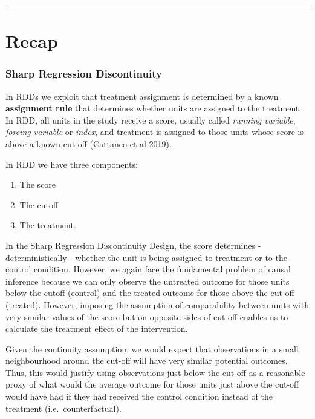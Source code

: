 \documentclass[
  letterpaper,
  DIV=11,
  numbers=noendperiod]{scrreprt}
\providecommand{\tightlist}{%
  \setlength{\itemsep}{0pt}\setlength{\parskip}{0pt}}\usepackage{longtable,booktabs,array}
\begin{document}
\hfill\break
\hfill\break

\begin{center}\rule{0.5\linewidth}{0.5pt}\end{center}

\hypertarget{recap}{%
\chapter{Recap}\label{recap}}

\hypertarget{sharp-regression-discontinuity}{%
\subsection{Sharp Regression
Discontinuity}\label{sharp-regression-discontinuity}}

In RDDs we exploit that treatment assignment is determined by a known
\textbf{assignment rule} that determines whether units are assigned to
the treatment. In RDD, all units in the study receive a score, usually
called \emph{running variable}, \emph{forcing variable} or \emph{index},
and treatment is assigned to those units whose score is above a known
cut-off (Cattaneo et al 2019).

In RDD we have three components:

\begin{enumerate}
\def\labelenumi{\arabic{enumi}.}
\tightlist
\item
  The score
\item
  The cutoff
\item
  The treatment.
\end{enumerate}

In the Sharp Regression Discontinuity Design, the score determines -
deterministically - whether the unit is being assigned to treatment or
to the control condition. However, we again face the fundamental problem
of causal inference because we can only observe the untreated outcome
for those units below the cutoff (control) and the treated outcome for
those above the cut-off (treated). However, imposing the assumption of
comparability between units with very similar values of the score but on
opposite sides of cut-off enables us to calculate the treatment effect
of the intervention.

Given the continuity assumption, we would expect that observations in a
small neighbourhood around the cut-off will have very similar potential
outcomes. Thus, this would justify using observations just below the
cut-off as a reasonable proxy of what would the average outcome for
those units just above the cut-off would have had if they had received
the control condition instead of the treatment (i.e.~counterfactual).
\end{document}
